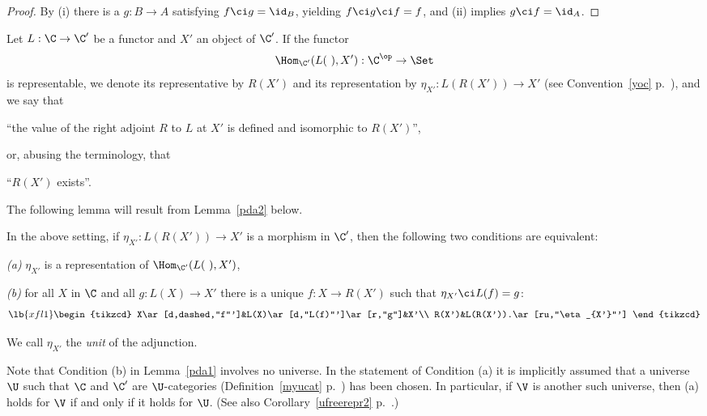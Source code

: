 \documentclass[12pt]{article}
\theoremstyle{remark}
\theoremstyle{definition}
\begin{document}
\begin{proof} By (i) there is a $g:B\to A$ satisfying $f\ci g=\id_B$, yielding $f\ci g\ci f=f$, and (ii) implies $g\ci f=\id_A$.
\end{proof}




\begin{s}
Let $L:\C\to\C'$ be a functor and $X'$ an object of $\C'$. If the functor 
$$
\Hom_{\C'}(L(\ ),X'):\C^{\op}\to\Set
$$ 
is representable, we denote its representative by $R(X')$ and its representation by $\eta_{X'}:L(R(X'))\to X'$ (see Convention~\ref{yoc} p.~), and we say that 

\nn``the value of the right adjoint $R$ to $L$ at $X'$ is defined and isomorphic to $R(X')$'', 

\nn or, abusing the terminology, that 

\nn``$R(X')$ exists''. 

The following lemma will result from Lemma~\ref{pda2} below. 

\begin{lem}
In the above setting, if $\eta_{X'}:L(R(X'))\to X'$ is a morphism in $\C'$, then the following two conditions are equivalent:

\nn\emph{(a)} $\eta_{X'}$ is a representation of $\Hom_{\C'}(L(\ ),X')$,

\nn\emph{(b)} for all $X$ in $\C$ and all $g:L(X)\to X'$ there is a unique $f:X\to R(X')$ such that $\eta_{X'}\ci L(f)=g$: 
\begin{equation}\lb{xfl1}
\begin{tikzcd}
X\ar[d,dashed,"f"']&L(X)\ar[d,"L(f)"']\ar[r,"g"]&X'\\ 
R(X')&L(R(X')).\ar[ru,"\eta_{X'}"']
\end{tikzcd}
\end{equation} 
\end{lem} 

We call $\eta_{X'}$ the \emph{unit} of the adjunction.
\end{s}

%

\begin{s}
Note that Condition (b) in Lemma~\ref{pda1} involves no universe. In the statement of Condition (a) it is implicitly assumed that a universe $\U$ such that $\C$ and $\C'$ are $\U$-categories (Definition~\ref{myucat} p.~) has been chosen. In particular, if $\V$ is another such universe, then (a) holds for $\V$ if and only if it holds for $\U$. (See also Corollary~\ref{ufreerepr2} p.~.)
\end{s}
\end{document}
